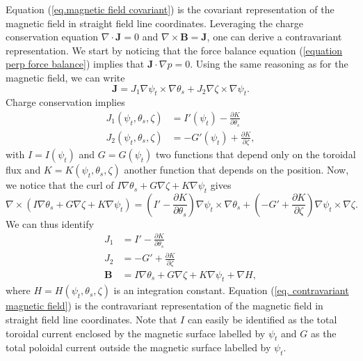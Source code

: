 Equation (\ref{eq.magnetic field covariant}) is the covariant representation of the magnetic field in straight field line coordinates. Leveraging the charge conservation equation $\nabla\cdot\mathbf{J}=0$ and $\nabla\times\mathbf{B}=\mathbf{J}$, one can derive a contravariant representation. We start by noticing that the force balance equation (\ref{equation perp force balance}) implies that $\mathbf{J}\cdot\nabla p =0$. Using the same reasoning as for the magnetic field, we can write
\begin{equation}
	\mathbf{J}=J_1\nabla\psi_t\times\nabla\theta_s + J_2\nabla\zeta\times\nabla\psi_t.
\end{equation}
Charge conservation implies
\begin{align}
	J_1(\psi_t,\theta_s,\zeta) &= I'(\psi_t) - \frac{\partial K}{\partial \theta_s}\\
	J_2(\psi_t,\theta_s,\zeta) &= -G'(\psi_t) + \frac{\partial K}{\partial \zeta},
\end{align}
with $I=I(\psi_t)$ and $G=G(\psi_t)$ two functions that depend only on the toroidal flux and $K=K(\psi_t,\theta_s,\zeta)$ another function that depends on the position. Now, we notice that the curl of $I\nabla\theta_s + G\nabla\zeta + K\nabla\psi_t$ gives
\begin{equation}
	\nabla\times(I\nabla\theta_s + G\nabla\zeta + K\nabla\psi_t) = \left(I'-\frac{\partial K}{\partial \theta_s}\right) \nabla\psi_t\times\nabla\theta_s + \left(-G'+\frac{\partial K}{\partial \zeta}\right) \nabla\psi_t\times\nabla\zeta.
\end{equation}
We can thus identify
\begin{align}
	J_1 &= I'-\frac{\partial K}{\partial \theta_s}\\
	J_2 &= -G'+\frac{\partial K}{\partial \zeta}\\
	\mathbf{B} &= I\nabla\theta_s + G\nabla\zeta + K\nabla\psi_t + \nabla H, \label{eq. contravariant magnetic field}
\end{align}
where $H=H(\psi_t,\theta_s,\zeta)$ is an integration constant. Equation (\ref{eq. contravariant magnetic field}) is the contravariant representation of the magnetic field in straight field line coordinates. Note that $I$ can easily be identified as the total toroidal current enclosed by the magnetic surface labelled by $\psi_t$ and $G$ as the total poloidal current outside the magnetic surface labelled by $\psi_t$.

